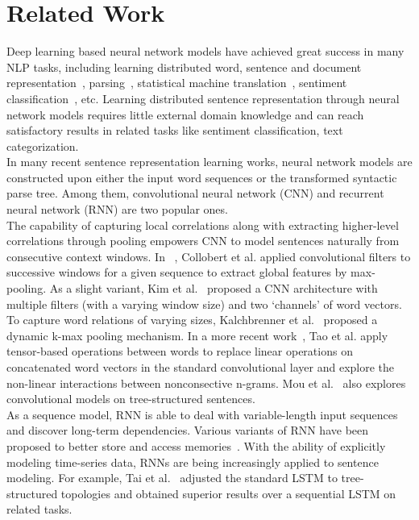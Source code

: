 \documentclass[11pt,letterpaper]{article}
\begin{document}
\section{Related Work}
Deep learning based neural network models have achieved great success in
many NLP tasks, including learning distributed word, sentence
and document representation~\cite{wordrep,pv}, parsing~\cite{parsing},
statistical machine translation~\cite{smt}, sentiment
classification~\cite{kim}, etc.
Learning distributed sentence representation through neural network
models requires little external domain knowledge and can reach
satisfactory results in related tasks like sentiment classification,
text categorization.\\
\indent In many recent sentence representation learning works, neural
network models are constructed upon either the input word sequences or
the transformed syntactic parse tree. Among them,
convolutional neural network (CNN) and recurrent neural network (RNN)
are two popular ones. \\
\indent The capability of capturing local correlations along with
extracting higher-level correlations through pooling empowers CNN to
model sentences naturally from consecutive context windows. In
~\cite{scratch}, Collobert et al. applied convolutional filters to
successive windows for a given sequence to extract global features by
max-pooling. As a slight variant, Kim et al.~ proposed a
CNN architecture with multiple filters (with a varying window size) and
two `channels' of word vectors. To capture word relations of varying
sizes, Kalchbrenner et al.~ proposed a dynamic k-max
pooling mechanism. In a more recent work~\cite{tao}, Tao et al. apply
tensor-based operations between words to replace linear operations on
concatenated word vectors in the standard convolutional layer and %
explore the non-linear interactions between nonconsective n-grams. Mou
et al.~ also explores convolutional models on
tree-structured sentences. \\
\indent As a sequence model, RNN is able to deal with variable-length
input sequences and discover long-term dependencies. Various variants of
RNN have been proposed to better store and access
memories~\cite{lstm,gru}. With the ability of explicitly modeling
time-series data, RNNs are being increasingly applied to sentence
modeling. For example, Tai et al.~ adjusted the
standard LSTM to tree-structured topologies and obtained superior results
over a sequential LSTM on related tasks.\\
\end{document}
